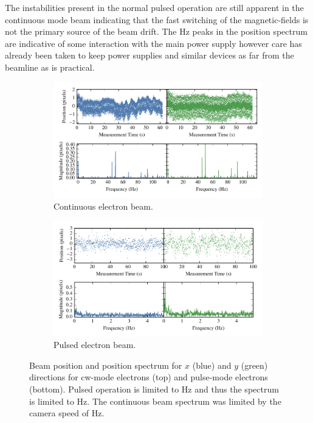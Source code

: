 The instabilities present in the normal pulsed operation are still apparent in the continuous mode beam indicating that the fast switching of the magnetic-fields is not the primary source of the beam drift.
The \unit[50]{Hz} peaks in the position spectrum are indicative of some interaction with the main power supply however care has already been taken to keep power supplies and similar devices as far from the beamline as is practical.

\begin{figure}
    \begin{subfigure}{\linewidth}
    \centering
    \includegraphics{part2/Figs/cw_beam_stability.pdf}
    \caption{Continuous electron beam.}
    \label{figure:cw_stability}
    \end{subfigure}

    \begin{subfigure}{\linewidth}
    \centering
    \includegraphics{part2/Figs/pulse_beam_stability.pdf}
    \caption{Pulsed electron beam.}
    \label{figure:pulse_stability}
    \end{subfigure}
    \caption[Beam stability for continuous and pulsed operation.]{Beam position and position spectrum for $x$ (blue) and $y$ (green) directions for \gls{cw}-mode electrons (top) and pulse-mode electrons (bottom).
    Pulsed operation is limited to \unit[10]{Hz} and thus the spectrum is limited to \unit[5]{Hz}. The continuous beam spectrum was limited by the camera speed of \unit[240]{Hz}.}
    \label{figure:stability}
\end{figure}

